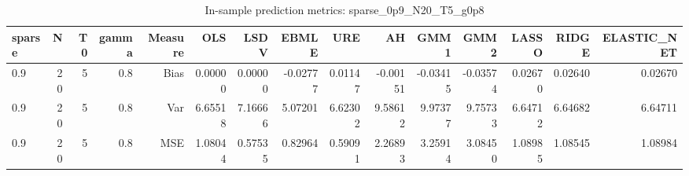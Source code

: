 \begin{table}[!htbp]\centering
\caption{In-sample prediction metrics: sparse_0p9_N20_T5_g0p8}
\label{tab:table2_sparse_0p9_N20_T5_g0p8}
\begin{tabular}{lrrrrrrrrrrrrrr}
\hline
sparse & N & T0 & gamma & Measure & OLS & LSDV & EBMLE & URE & AH & GMM1 & GMM2 & LASSO & RIDGE & ELASTIC_NET \\
\hline
0.9 & 20 & 5 & 0.8 & Bias & 0.00000 & 0.00000 & -0.02777 & 0.01147 & -0.00151 & -0.03415 & -0.03574 & 0.02670 & 0.02640 & 0.02670 \\
0.9 & 20 & 5 & 0.8 & Var & 6.65518 & 7.16666 & 5.07201 & 6.62302 & 9.58612 & 9.97377 & 9.75733 & 6.64712 & 6.64682 & 6.64711 \\
0.9 & 20 & 5 & 0.8 & MSE & 1.08044 & 0.57535 & 0.82964 & 0.59091 & 2.26893 & 3.25914 & 3.08450 & 1.08985 & 1.08545 & 1.08984 \\
\hline
\end{tabular}
\end{table}

